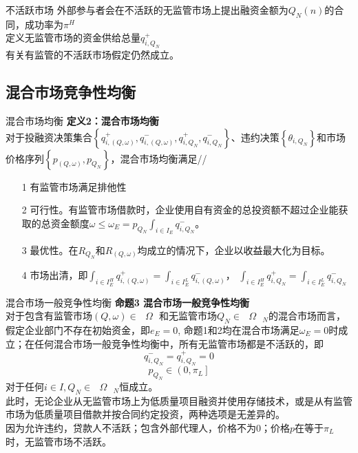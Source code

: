 \documentclass{beamer}
\begin{document}
\begin{frame}{不活跃市场}
	外部参与者会在不活跃的无监管市场上提出融资金额为$Q_N\left(n\right)$的合同，成功率为$\pi^H$\\
	定义无监管市场的资金供给总量$ q_{i,{{Q}_{N}}}^{+} $\\
	有关有监管的不活跃市场假定仍然成立。
	

\end{frame}

\subsection{混合市场竞争性均衡}

\begin{frame}{混合市场均衡}
	\textbf{定义2：混合市场均衡}\\
	对于投融资决策集合$\left\{ q_{i,\left( Q,\omega  \right)}^{+},q_{i,\left( Q,\omega  \right)}^{-},q_{i,{{Q}_{N}}}^{+},q_{i,{{Q}_{N}}}^{-} \right\}$、违约决策$\left\{ {{\theta }_{i,{{Q}_{N}}}} \right\}$和市场价格序列$\left\{ {{p}_{\left( Q,\omega  \right)}},{{p}_{{{Q}_{N}}}} \right\}$，混合市场均衡满足//
	\begin{itemize}
		\item[1] 有监管市场满足排他性
		\item[2] 可行性。有监管市场借款时，企业使用自有资金的总投资额不超过企业能获取的总资金额度$\omega \le {{\omega }_{E}}={{p}_{{{Q}_{N}}}}\mathop{\int }_{i\in {{I}_{E}}}q_{i,{{Q}_{N}}}^{-}$。
		\item[3] 最优性。在$R_{Q_N}$和$R_{\left(Q,\omega\right)}$均成立的情况下，企业以收益最大化为目标。
		\item[4] 市场出清，即$\mathop{\int }_{i\in I_{E}^{H}}q_{i,\left( Q,\omega  \right)}^{+}=\mathop{\int }_{i\in I_{E}^{L}}q_{i,\left( Q,\omega  \right)}^{-}$，		$\mathop{\int }_{i\in I_{E}^{H}}q_{i,{{Q}_{N}}}^{+}=\mathop{\int }_{i\in I_{E}^{L}}q_{i,{{Q}_{N}}}^{-}$
	\end{itemize}
\end{frame}

\begin{frame}{混合市场一般竞争性均衡}
	\textbf{命题3 混合市场一般竞争性均衡}\\
	对于包含有监管市场$\left( Q,\omega  \right)\in \text{ }\!\!\Omega\!\!\text{ }$和无监管市场${{Q}_{N}}\in {{\text{ }\!\!\Omega\!\!\text{ }}_{N}}$的混合市场而言，假定企业部门不存在初始资金，即${{e}_{E}}=0$, 命题1和2均在混合市场满足${{\omega }_{E}}=0$时成立；在任何混合市场一般竞争性均衡中，所有无监管市场都是不活跃的，即
	$$q_{i,{{Q}_{N}}}^{-}=q_{i,{{Q}_{N}}}^{+}=0$$
	$${{p}_{{{Q}_{N}}}}\in \left( 0,{{\pi }_{L}} \right]$$
	对于任何$i\in I,{{Q}_{N}}\in {{\text{ }\!\!\Omega\!\!\text{ }}_{N}}$恒成立。\\
	此时，无论企业从无监管市场上为低质量项目融资并使用存储技术，或是从有监管市场为低质量项目借款并按合同约定投资，两种选项是无差异的。\\
	因为允许违约，贷款人不活跃；包含外部代理人，价格不为0；价格$p$在等于$ {\pi }_{L} $时，无监管市场不活跃。
\end{frame}
\end{document}
